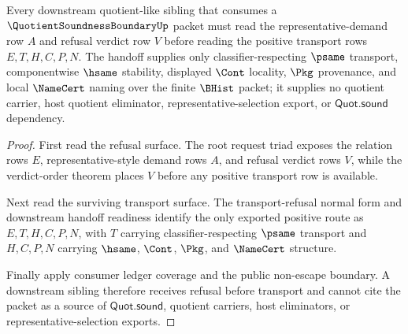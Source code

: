 \begin{theorem}
\label{thm:quotient-soundness-boundary-refusal-transport-sibling-handoff}
Every downstream quotient-like sibling that consumes a
$\QuotientSoundnessBoundaryUp$ packet must read the representative-demand row
$A$ and refusal verdict row $V$ before reading the positive transport rows
$E,T,H,C,P,N$. The handoff supplies only classifier-respecting $\psame$
transport, componentwise $\hsame$ stability, displayed $\Cont$ locality,
$\Pkg$ provenance, and local $\NameCert$ naming over the finite $\BHist$
packet; it supplies no quotient carrier, host quotient eliminator,
representative-selection export, or $\mathsf{Quot.sound}$ dependency.
\end{theorem}
\begin{proof}
First read the refusal surface. The root request triad exposes the relation
rows $E$, representative-style demand rows $A$, and refusal verdict rows $V$,
while the verdict-order theorem places $V$ before any positive transport row is
available.

Next read the surviving transport surface. The transport-refusal normal form
and downstream handoff readiness identify the only exported positive route as
$E,T,H,C,P,N$, with $T$ carrying classifier-respecting $\psame$ transport and
$H,C,P,N$ carrying $\hsame$, $\Cont$, $\Pkg$, and $\NameCert$ structure.

Finally apply consumer ledger coverage and the public non-escape boundary. A
downstream sibling therefore receives refusal before transport and cannot cite
the packet as a source of $\mathsf{Quot.sound}$, quotient carriers, host
eliminators, or representative-selection exports.
\end{proof}

